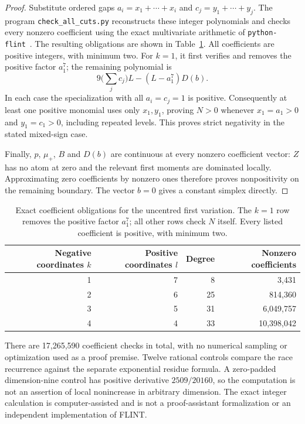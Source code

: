 \documentclass[11pt,a4paper]{article}
\begin{document}
\begin{proof}
Substitute ordered gaps $a_i=x_1+\cdots+x_i$ and
$c_j=y_1+\cdots+y_j$. The program \texttt{check\_all\_cuts.py}
reconstructs these integer polynomials and checks every nonzero
coefficient using the exact multivariate arithmetic of
\texttt{python-flint}~\cite{python-flint}. The resulting obligations are
shown in Table~\ref{tab:all-cuts}. All coefficients are positive integers,
with minimum two. For $k=1$, it first verifies and removes the positive
factor $a_1^7$; the remaining polynomial is
\[
 9\Big(\sum_jc_j\Big)L-(L-a_1^7)D(b).
\]
In each case the specialization with all $a_i=c_j=1$ is positive.
Consequently at least one positive monomial uses only $x_1,y_1$,
proving $N>0$ whenever $x_1=a_1>0$ and $y_1=c_1>0$,
including repeated levels.
This proves strict negativity in the stated mixed-sign case.

Finally, $p$, $\mu_+$, $B$ and $D(b)$ are continuous at every nonzero
coefficient vector: $Z$ has no atom at zero and the relevant first
moments are dominated locally. Approximating zero coefficients by
nonzero ones therefore proves nonpositivity on the remaining boundary.
The vector $b=0$ gives a constant simplex directly.
\end{proof}

\begin{table}[htbp]
\centering
\caption{Exact coefficient obligations for the uncentred first variation.
The $k=1$ row removes the positive factor $a_1^7$; all other rows check
$N$ itself. Every listed coefficient is positive, with minimum two.}
\label{tab:all-cuts}
\begin{tabular}{rrrr}
\toprule
Negative coordinates $k$ & Positive coordinates $l$ & Degree & Nonzero coefficients\\
\midrule
1 & 7 & 8 & 3,431\\
2 & 6 & 25 & 814,360\\
3 & 5 & 31 & 6,049,757\\
4 & 4 & 33 & 10,398,042\\
\bottomrule
\end{tabular}
\end{table}

There are 17,265,590 coefficient checks in total, with no numerical
sampling or optimization used as a proof premise. Twelve rational
controls compare the race recurrence against the separate exponential
residue formula. A zero-padded dimension-nine control has positive
derivative $2509/20160$, so the computation is not an assertion of local
nonincrease in arbitrary dimension. The exact integer calculation is
computer-assisted and is not a proof-assistant formalization or an
independent implementation of FLINT.
\end{document}
